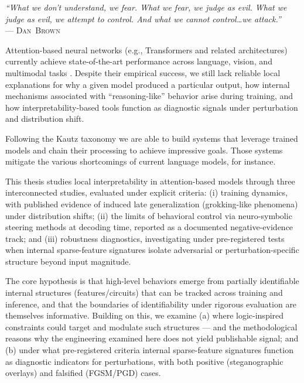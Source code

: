 ﻿\documentclass[../ppgc-tese.tex]{subfiles}
\begin{document}
\begin{flushright}
\mbox{}%
{\sffamily\itshape
``What we don't understand, we fear. What we fear, we judge as evil. What we judge as evil, we attempt to control. And what we cannot control\dots we attack.'' \\}
--- \textsc{Dan~Brown}
\end{flushright}


Attention-based neural networks (e.g., Transformers and related architectures) currently achieve state-of-the-art performance across language, vision, and multimodal tasks \cite{vaswani2017attention,brown2020gpt3,openai2023gpt4,dosovitskiy2021vit,radford2021clip}. Despite their empirical success, we still lack reliable local explanations for why a given model produced a particular output, how internal mechanisms associated with ``reasoning-like'' behavior arise during training, and how interpretability-based tools function as diagnostic signals under perturbation and distribution shift.

Following the Kautz taxonomy \cite{kautz2022thirdaisummer} we are able to build systems that leverage trained models and chain their processing to achieve impressive goals. Those systems mitigate the various shortcomings of current language models, for instance.

This thesis studies local interpretability in attention-based models through three interconnected studies, evaluated under explicit criteria: (i) training dynamics, with published evidence of induced late generalization (grokking-like phenomena) under distribution shifts; (ii) the limits of behavioral control via neuro-symbolic steering methods at decoding time, reported as a documented negative-evidence track; and (iii) robustness diagnostics, investigating under pre-registered tests when internal sparse-feature signatures isolate adversarial or perturbation-specific structure beyond input magnitude.

The core hypothesis is that high-level behaviors emerge from partially identifiable internal structures (features/circuits) that can be tracked across training and inference, and that the boundaries of identifiability under rigorous evaluation are themselves informative. Building on this, we examine (a) where logic-inspired constraints could target and modulate such structures --- and the methodological reasons why the engineering examined here does not yield publishable signal; and (b) under what pre-registered criteria internal sparse-feature signatures function as diagnostic indicators for perturbations, with both positive (steganographic overlays) and falsified (FGSM/PGD) cases.
\end{document}
